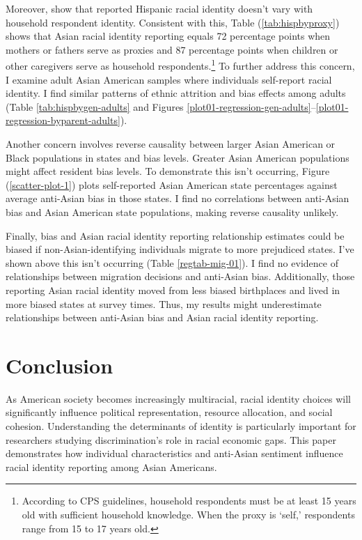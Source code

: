 Moreover, \textcite{duncanIntermarriageIntergenerationalTransmission2011} show that reported Hispanic racial identity doesn't vary with household respondent identity. Consistent with this, Table (\ref{tab:hispbyproxy}) shows that Asian racial identity reporting equals 72 percentage points when mothers or fathers serve as proxies and 87 percentage points when children or other caregivers serve as household respondents.\footnote{According to CPS guidelines, household respondents must be at least 15 years old with sufficient household knowledge. When the proxy is `self,' respondents range from 15 to 17 years old.} To further address this concern, I examine adult Asian American samples where individuals self-report racial identity. I find similar patterns of ethnic attrition and bias effects among adults (Table \ref{tab:hispbygen-adults} and Figures \ref{plot01-regression-gen-adults}--\ref{plot01-regression-byparent-adults}).

Another concern involves reverse causality between larger Asian American or Black populations in states and bias levels. Greater Asian American populations might affect resident bias levels. To demonstrate this isn't occurring, Figure (\ref{scatter-plot-1}) plots self-reported Asian American state percentages against average anti-Asian bias in those states. I find no correlations between anti-Asian bias and Asian American state populations, making reverse causality unlikely.

Finally, bias and Asian racial identity reporting relationship estimates could be biased if non-Asian-identifying individuals migrate to more prejudiced states. I've shown above this isn't occurring (Table \ref{regtab-mig-01}). I find no evidence of relationships between migration decisions and anti-Asian bias. Additionally, those reporting Asian racial identity moved from less biased birthplaces and lived in more biased states at survey times. Thus, my results might underestimate relationships between anti-Asian bias and Asian racial identity reporting.

\section{Conclusion}\label{sec:conc}

As American society becomes increasingly multiracial, racial identity choices will significantly influence political representation, resource allocation, and social cohesion. Understanding the determinants of identity is particularly important for researchers studying discrimination's role in racial economic gaps. This paper demonstrates how individual characteristics and anti-Asian sentiment influence racial identity reporting among Asian Americans.


